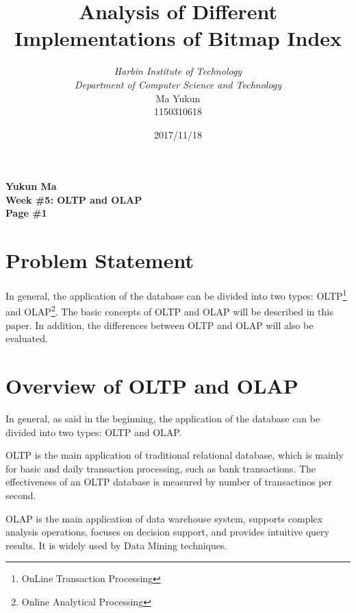 \documentclass[12pt, a4paper]{article}
\begin{document}
\title{{\bf\Huge Analysis of Different Implementations of Bitmap Index}}
\author{\emph{Harbin Institute of Technology}\\\emph{Department of Computer Science and Technology}\\Ma Yukun\\1150310618}

\date{2017/11/18}

\nocite{*}


\begin{center}
{\textbf{
Yukun Ma\\
Week \#5: OLTP and OLAP\\
Page \#1}}
\end{center}

\section{Problem Statement}

In general, the application of the database can be divided into two types: OLTP\footnote{OnLine Transaction Processing} and OLAP\footnote{Online Analytical Processing}. The basic concepts of OLTP and OLAP will be described in this paper. In addition, the differences between OLTP and OLAP will also be evaluated.




\section{Overview of OLTP and OLAP}

In general, as said in the beginning, the application of the database can be divided into two types: OLTP and OLAP.

OLTP is the main application of traditional relational database, which is mainly for basic and daily transaction processing, such as bank transactions. The effectiveness of an OLTP database is measured by number of transactinos per second.\cite{diff}

OLAP is the main application of data warehouse system, supports complex analysis operations, focuses on decision support, and provides intuitive query results. It is widely used by Data Mining techniques.\cite{wiki}
\end{document}
